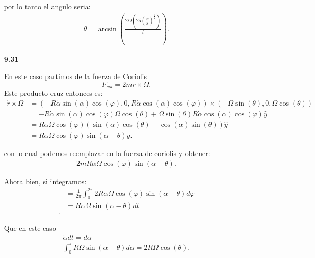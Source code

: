\documentclass[12pt]{exam}
\begin{document}
\begin{enumerate}
    por lo tanto el angulo seria:
    \begin{align*}
      \theta = \arcsin\left( \frac{2\Omega\left( 25\left( \frac{2l}{g} \right)^{\frac{3}{2}} \right) }{l} \right) 
    .\end{align*}
  \item[\textbf{9.31}]

    En este caso partimos de la fuerza de Coriolis \[
      F_{col}=2m\dot{r}\times \Omega
    .\] Este producto cruz entonces es:
    \begin{align*}
      \dot{r}\times \Omega &= \left( -R\dot{\alpha}\sin\left( \alpha \right) \cos\left( \varphi \right) ,0,R\dot{\alpha}\cos\left( \alpha \right) \cos\left( \varphi \right)  \right) \times \left( -\Omega\sin\left( \theta \right) ,0,\Omega\cos\left( \theta \right)  \right) \\
			   &=  -R\dot{\alpha}\sin\left( \alpha \right) \cos\left( \varphi \right)\Omega\cos\left( \theta \right)  + \Omega\sin\left( \theta \right) R\dot{\alpha}\cos\left( \alpha \right) \cos\left( \varphi \right) \hat{y}\\
			   &= R\dot{\alpha}\Omega\cos\left( \varphi \right)\left( \sin\left( \alpha \right) \cos\left( \theta \right) - \cos\left( \alpha \right) \sin\left( \theta \right)  \right) \hat{y}\\
			   &= R\dot{\alpha}\Omega\cos\left( \varphi \right) \sin\left( \alpha - \theta \right) \hat{y}
    .\end{align*}

    con lo cual podemos reemplazar en la fuerza de coriolis y obtener:
    \begin{align*}
      2mR\dot{\alpha}\Omega\cos\left( \varphi \right) \sin\left( \alpha - \theta \right) 
    .\end{align*}
    
    Ahora bien, si integramos:
    \begin{align*}
      &= \frac{1}{2\pi}\int_{0}^{2\pi}2R\dot{\alpha}\Omega\cos\left( \varphi \right) \sin\left( \alpha-\theta \right) d\varphi\\
      &= R\dot{\alpha}\Omega\sin\left( \alpha - \theta \right) dt \\
    .\end{align*}

    Que en este caso
    \begin{align*}
      \dot{\alpha}dt = d\alpha \\
      \int_{0}^{\pi}R\Omega\sin\left( \alpha - \theta \right) d\alpha = 2R\Omega\cos\left( \theta \right) 
    .\end{align*}


\end{enumerate}
\end{document}
